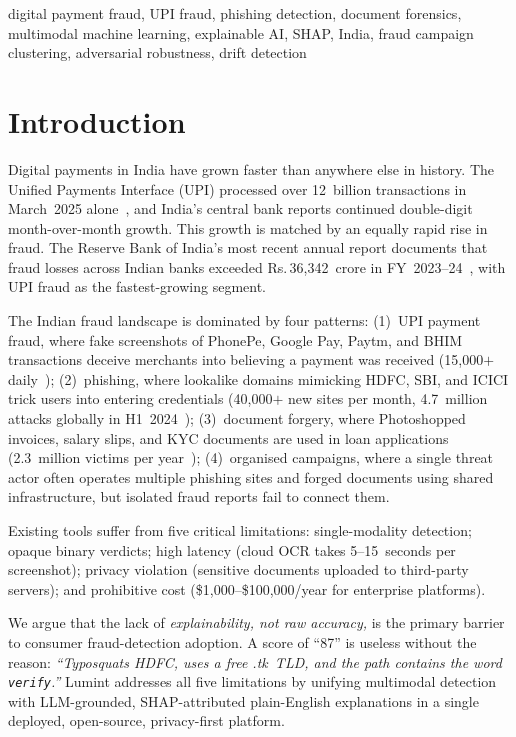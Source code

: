 \documentclass[conference]{IEEEtran}
\def\rupee{\textrm{Rs.\,}}
\begin{document}
\begin{IEEEkeywords}
digital payment fraud, UPI fraud, phishing detection, document
forensics, multimodal machine learning, explainable AI, SHAP, India,
fraud campaign clustering, adversarial robustness, drift detection
\end{IEEEkeywords}

\section{Introduction}

Digital payments in India have grown faster than anywhere else in
history. The Unified Payments Interface (UPI) processed over
12~billion transactions in March~2025 alone~\cite{npci2025}, and
India's central bank reports continued double-digit month-over-month
growth. This growth is matched by an equally rapid rise in fraud.
The Reserve Bank of India's most recent annual report documents that
fraud losses across Indian banks exceeded \rupee{}36{,}342~crore in
FY~2023--24~\cite{rbi2024}, with UPI fraud as the fastest-growing
segment.

The Indian fraud landscape is dominated by four patterns: (1)~UPI
payment fraud, where fake screenshots of PhonePe, Google Pay, Paytm,
and BHIM transactions deceive merchants into believing a payment was
received (15{,}000$+$ daily~\cite{certin2024}); (2)~phishing, where
lookalike domains mimicking HDFC, SBI, and ICICI trick users into
entering credentials (40{,}000$+$ new sites per month, 4.7~million
attacks globally in H1~2024~\cite{apwg2024}); (3)~document forgery,
where Photoshopped invoices, salary slips, and KYC documents are used
in loan applications (2.3~million victims per
year~\cite{rbi2023framework}); (4)~organised campaigns, where a single
threat actor often operates multiple phishing sites and forged
documents using shared infrastructure, but isolated fraud reports fail
to connect them.

Existing tools suffer from five critical limitations: single-modality
detection; opaque binary verdicts; high latency (cloud OCR takes
5--15~seconds per screenshot); privacy violation (sensitive documents
uploaded to third-party servers); and prohibitive cost
(\$1{,}000--\$100{,}000/year for enterprise platforms).

We argue that the lack of \textit{explainability, not raw accuracy,} is
the primary barrier to consumer fraud-detection adoption. A score of
``87'' is useless without the reason: \textit{``Typosquats HDFC, uses a
free .tk~TLD, and the path contains the word \texttt{verify}.''} Lumint
addresses all five limitations by unifying multimodal detection with
LLM-grounded, SHAP-attributed plain-English explanations in a single
deployed, open-source, privacy-first platform.
\end{document}
